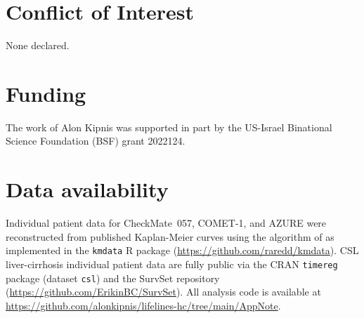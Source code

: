 \documentclass[unnumsec,webpdf,contemporary,large]{oup-authoring-template}
\begin{document}


\section*{Conflict of Interest}
None declared.

\section*{Funding}
The work of Alon Kipnis was supported in part by the US-Israel Binational Science Foundation (BSF) grant 2022124.

\section*{Data availability}
Individual patient data for CheckMate~057, COMET-1, and AZURE were
reconstructed from published Kaplan-Meier curves using the algorithm of
\citet{guyot2012} as implemented in the \texttt{kmdata} R package
(\url{https://github.com/raredd/kmdata}). CSL liver-cirrhosis individual
patient data are fully public via the CRAN \texttt{timereg} package
(dataset \texttt{csl}) and the SurvSet repository \citep{survset2022}
(\url{https://github.com/ErikinBC/SurvSet}).
All analysis code is available at
\url{https://github.com/alonkipnis/lifelines-hc/tree/main/AppNote}.


\end{document}
